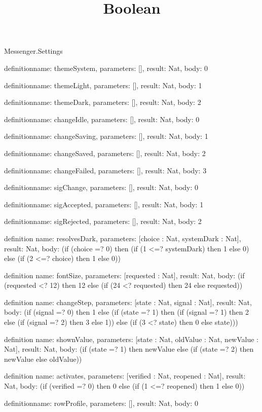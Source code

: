 \begin{lexlean}{Messenger.Settings}
\title{Boolean}
\begin{semanticmodule}
definition{name: themeSystem, parameters: [], result: Nat, body: 0}

definition{name: themeLight, parameters: [], result: Nat, body: 1}

definition{name: themeDark, parameters: [], result: Nat, body: 2}

definition{name: changeIdle, parameters: [], result: Nat, body: 0}

definition{name: changeSaving, parameters: [], result: Nat, body: 1}

definition{name: changeSaved, parameters: [], result: Nat, body: 2}

definition{name: changeFailed, parameters: [], result: Nat, body: 3}

definition{name: sigChange, parameters: [], result: Nat, body: 0}

definition{name: sigAccepted, parameters: [], result: Nat, body: 1}

definition{name: sigRejected, parameters: [], result: Nat, body: 2}

definition{
  name: resolvesDark,
  parameters: [choice : Nat, systemDark : Nat],
  result: Nat,
  body: (if (choice =? 0) then (if (1 <=? systemDark) then 1 else 0) else (if (2 <=? choice) then 1 else 0))
}

definition{
  name: fontSize,
  parameters: [requested : Nat],
  result: Nat,
  body: (if (requested <? 12) then 12 else (if (24 <? requested) then 24 else requested))
}

definition{
  name: changeStep,
  parameters: [state : Nat, signal : Nat],
  result: Nat,
  body: (if (signal =? 0) then 1 else (if (state =? 1) then (if (signal =? 1) then 2 else (if (signal =? 2) then 3 else 1)) else (if (3 <? state) then 0 else state)))
}

definition{
  name: shownValue,
  parameters: [state : Nat, oldValue : Nat, newValue : Nat],
  result: Nat,
  body: (if (state =? 1) then newValue else (if (state =? 2) then newValue else oldValue))
}

definition{
  name: activates,
  parameters: [verified : Nat, reopened : Nat],
  result: Nat,
  body: (if (verified =? 0) then 0 else (if (1 <=? reopened) then 1 else 0))
}

definition{name: rowProfile, parameters: [], result: Nat, body: 0}


\end{semanticmodule}
\end{lexlean}
